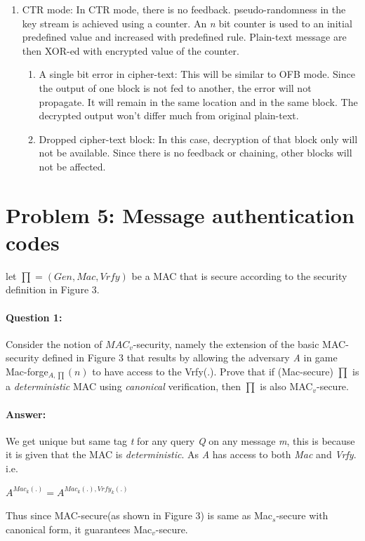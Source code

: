 \documentclass{article}
\begin{document}
\begin{enumerate}
\begin{enumerate}
                \end{enumerate}
            \item CTR mode: In CTR mode, there is no feedback. pseudo-randomness in the key stream is achieved using a counter. An \emph{n} bit counter is used to an initial predefined value and increased with predefined rule. Plain-text message are then XOR-ed with encrypted value of the counter.
                \begin{enumerate}
                    \item A single bit error in cipher-text:\newline
                        This will be similar to OFB mode. Since the output of one block is not fed to another, the error will not propagate. It will remain in the same location and in the same block. The decrypted output won't differ much from original plain-text.
                    \item Dropped cipher-text block: \newline
                    In this case, decryption of that block only will not be available. Since there is no feedback or chaining, other blocks will not be affected.            
                \end{enumerate}
        \end{enumerate}

\section{Problem 5: Message authentication codes}
    
    let $\prod = (Gen,Mac,Vrfy)$ be a MAC that is secure according to the security definition in Figure 3.
    
    \paragraph{Question 1:} Consider the notion of $MAC_v$-security, namely the extension of the basic MAC-security defined in Figure 3 that results by allowing the adversary \emph{A} in game Mac-forge$_{A,\prod}(n)$ to have access to the Vrfy(.). Prove that if (Mac-secure) $\prod$ is a \emph{deterministic} MAC using \emph{canonical} verification, then $\prod$ is also MAC$_v$-secure.
    
    \paragraph{Answer: \newline}
        We get unique but same tag \emph{t} for any query \emph{Q} on any message \emph{m}, this is because it is given that the MAC is \emph{deterministic}. \newline
         As \emph{A} has access to both \emph{Mac} and \emph{Vrfy}. \newline
        i.e.
        \begin{center}
            $A^{Mac_k(.)} = A^{Mac_k(.),Vrfy_k(.)}$
        \end{center}
        Thus since MAC-secure(as shown in Figure 3) is same as Mac$_s$-secure with canonical form, it guarantees Mac$_v$-secure.
    
\end{document}
